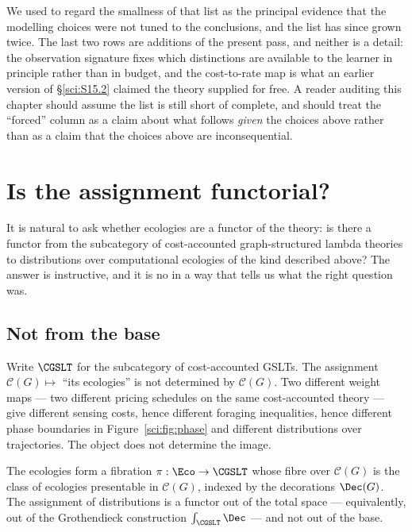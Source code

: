 We used to regard the smallness of that list as the principal evidence that the modelling choices were
not tuned to the conclusions, and the list has since grown twice. The last two rows are additions of
the present pass, and neither is a detail: the observation signature fixes which distinctions are
available to the learner in principle rather than in budget, and the cost-to-rate map is what an
earlier version of \S\ref{sci:S15.2} claimed the theory supplied for free. A reader auditing this
chapter should assume the list is still short of complete, and should treat the ``forced'' column as a
claim about what follows \emph{given} the choices above rather than as a claim that the choices above
are inconsequential.

\section{Is the assignment functorial?}\label{sci:S15}
\label{sci:sec:functor}

It is natural to ask whether ecologies are a functor of the theory: is there a functor from the
subcategory of cost-accounted graph-structured lambda theories to distributions over computational
ecologies of the kind described above? The answer is instructive, and it is no in a way that tells us
what the right question was.

\subsection{Not from the base}\label{sci:S15.1}

Write $\CGSLT$ for the subcategory of cost-accounted GSLTs. The assignment
$\mathcal{C}(G) \mapsto$ ``its ecologies'' is not determined by $\mathcal{C}(G)$. Two different weight
maps --- two different pricing schedules on the same cost-accounted theory --- give different sensing
costs, hence different foraging inequalities, hence different phase boundaries in
Figure~\ref{sci:fig:phase} and different distributions over trajectories. The object does not determine
the image.

\begin{proposition}
\label{sci:prop:fibration}
The ecologies form a fibration $\pi : \Eco \to \CGSLT$ whose fibre over $\mathcal{C}(G)$ is the class
of ecologies presentable in $\mathcal{C}(G)$, indexed by the decorations $\Dec(G)$. The assignment of
distributions is a functor out of the total space --- equivalently, out of the Grothendieck
construction $\textstyle\int_{\CGSLT} \Dec$ --- and not out of the base.
\end{proposition}

